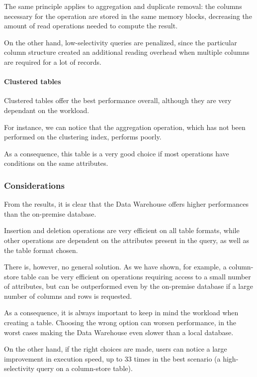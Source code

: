         The same principle applies to aggregation and duplicate removal: the columns necessary for the operation are stored in the same memory blocks, decreasing the amount of read operations needed to compute the result.
        
        On the other hand, low-selectivity queries are penalized, since the particular column structure created an additional reading overhead when multiple columns are required for a lot of records.
        
    \paragraph{Clustered tables}
        Clustered tables offer the best performance overall, although they are very dependant on the workload.
        
        For instance, we can notice that the aggregation operation, which has not been performed on the clustering index, performs poorly.
        
        As a consequence, this table is a very good choice if most operations have conditions on the same attributes.
        
\subsubsection{Considerations}
    From the results, it is clear that the Data Warehouse offers higher performances than the on-premise database.
    
    Insertion and deletion operations are very efficient on all table formats, while other operations are dependent on the attributes present in the query, as well as the table format chosen.
    
    There is, however, no general solution.
    As we have shown, for example, a column-store table can be very efficient on operations requiring access to a small number of attributes, but can be outperformed even by the on-premise database if a large number of columns and rows is requested.
    
    As a consequence, it is always important to keep in mind the workload when creating a table.
    Choosing the wrong option can worsen performance, in the worst cases making the Data Warehouse even slower than a local database.
    
    On the other hand, if the right choices are made, users can notice a large improvement in execution speed, up to 33 times in the best scenario (a high-selectivity query on a column-store table).
    
